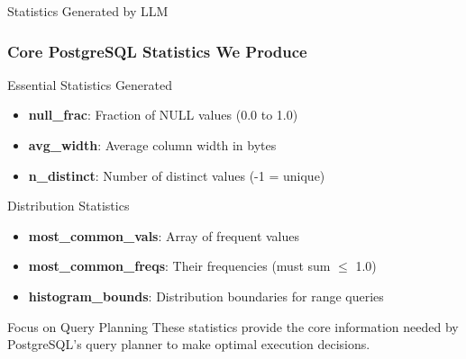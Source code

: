 \documentclass{beamer}
\begin{document}
\begin{frame}{Statistics Generated by LLM}
\frametitle{Core PostgreSQL Statistics We Produce}

\begin{block}{Essential Statistics Generated}
\begin{itemize}
    \item \textbf{null\_frac}: Fraction of NULL values (0.0 to 1.0)
    \item \textbf{avg\_width}: Average column width in bytes
    \item \textbf{n\_distinct}: Number of distinct values (-1 = unique)
\end{itemize}
\end{block}

\begin{block}{Distribution Statistics}
\begin{itemize}
    \item \textbf{most\_common\_vals}: Array of frequent values
    \item \textbf{most\_common\_freqs}: Their frequencies (must sum $\leq$ 1.0)
    \item \textbf{histogram\_bounds}: Distribution boundaries for range queries
\end{itemize}
\end{block}

\begin{alertblock}{Focus on Query Planning}
These statistics provide the core information needed by PostgreSQL's query planner to make optimal execution decisions.
\end{alertblock}

\end{frame}
\end{document}
